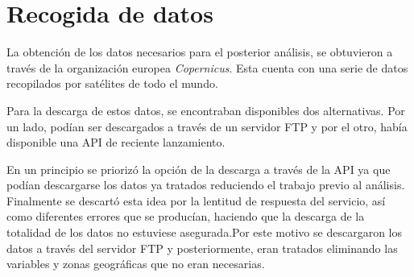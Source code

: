 
\begin{comment}
Este apartado pretende recoger los aspectos más interesantes del desarrollo del proyecto, comentados por los autores del mismo.
Debe incluir desde la exposición del ciclo de vida utilizado, hasta los detalles de mayor relevancia de las fases de análisis, diseño e implementación.
Se busca que no sea una mera operación de copiar y pegar diagramas y extractos del código fuente, sino que realmente se justifiquen los caminos de solución que se han tomado, especialmente aquellos que no sean triviales.
Puede ser el lugar más adecuado para documentar los aspectos más interesantes del diseño y de la implementación, con un mayor hincapié en aspectos tales como el tipo de arquitectura elegido, los índices de las tablas de la base de datos, normalización y desnormalización, distribución en ficheros3, reglas de negocio dentro de las bases de datos (EDVHV GH GDWRV DFWLYDV), aspectos de desarrollo relacionados con el WWW...
Este apartado, debe convertirse en el resumen de la experiencia práctica del proyecto, y por sí mismo justifica que la memoria se convierta en un documento útil, fuente de referencia para los autores, los tutores y futuros alumnos.
\end{comment}


\section{Recogida de datos}
La obtención de los datos necesarios para el posterior análisis, se obtuvieron a través de la organización europea \emph{Copernicus}. Esta cuenta con una serie de datos recopilados por satélites de todo el mundo.

Para la descarga de estos datos, se encontraban disponibles dos alternativas. Por un lado, podían ser descargados a través de un servidor FTP y por el otro, había disponible una API de reciente lanzamiento.

En un principio se priorizó la opción de la descarga a través de la API ya que podían descargarse los datos ya tratados reduciendo el trabajo previo al análisis. Finalmente se descartó esta idea por la lentitud de respuesta del servicio, así como diferentes errores que se producían, haciendo que la descarga de la totalidad de los datos no estuviese asegurada.Por este motivo se descargaron los datos a través del servidor FTP y posteriormente, eran tratados eliminando las variables y zonas geográficas que no eran necesarias.

